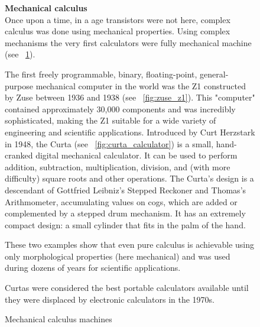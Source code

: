 \begin{figure}[]
    \centering
    \begin{boxedminipage}{0.95\textwidth}
        \textbf{Mechanical calculus}\\
        Once upon a time, in a age transistors were not here, complex calculus was done using mechanical properties.
        Using complex mechanisms the very first calculators were fully mechanical machine (see \figurename~\ref{fig:mechanical_computer}).

        The first freely programmable, binary, floating-point, general-purpose mechanical computer in the world was the Z1 constructed by Zuse between 1936 and 1938 (see \figurename~\ref{fig:zuse_z1}).
        This "computer" contained approximately 30,000 components and was incredibly sophisticated, making the Z1 suitable for a wide variety of engineering and scientific applications.
        Introduced by Curt Herzstark in 1948, the Curta (see \figurename~\ref{fig:curta_calculator}) is a small, hand-cranked digital mechanical calculator.
        It can be used to perform addition, subtraction, multiplication, division, and (with more difficulty) square roots and other operations.
        The Curta's design is a descendant of Gottfried Leibniz's Stepped Reckoner and Thomas's Arithmometer, accumulating values on cogs, which are added or complemented by a stepped drum mechanism.
        It has an extremely compact design: a small cylinder that fits in the palm of the hand.

        These two examples show that even pure calculus is achievable using only morphological properties (here mechanical) and was used during dozens of years for scientific applications.


        Curtas were considered the best portable calculators available until they were displaced by electronic calculators in the 1970s.

        \begin{center}

            \hfil
            \caption{Mechanical calculus machines}
            \label{fig:mechanical_computer}

        \end{center}

    \end{boxedminipage}
\end{figure}


